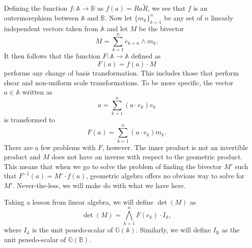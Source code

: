 \documentclass[12pt]{article}
\newcommand{\G}{\mathbb{G}}
\newcommand{\A}{\mathbb{A}}
\newcommand{\B}{\mathbb{B}}
\begin{document}
Defining the function $f:\A\to\B$ as $f(a)=Ra\tilde{R}$, we see that $f$ is an
outermorephism between $\A$ and $\B$.  Now let $\{m_k\}_{k=1}^n$ be any
set of $n$ linearly independent vectors taken from $\A$ and let $M$ be the
bivector
\begin{equation*}
M = \sum_{k=1}^n e_{k+n}\wedge m_k.
\end{equation*}
It then follows that the function $F:\A\to\A$ defined as
\begin{equation*}
F(a) = f(a)\cdot M
\end{equation*}
performs any change of basis transformation.  This includes those
that perform shear and non-uniform scale transformations.  To be more specific,
the vector $a\in\A$ written as
\begin{equation*}
a = \sum_{k=1}^n (a\cdot e_k)e_k
\end{equation*}
is transformed to
\begin{equation*}
F(a) = \sum_{k=1}^n (a\cdot e_k)m_k.
\end{equation*}
There are a few problems with $F$,
however.  The inner product is not an invertible product and $M$ does
not have an inverse with respect to the geometric product.  This means
that when we go to solve the problem of finding the bivector $M'$ such
that $F^{-1}(a) = M'\cdot f(a)$, geometric algebra offers no obvious
way to solve for $M'$.  Never-the-less, we will make do with what we have here.

Taking a lesson from linear algebra, we will define $\det(M)$ as
\begin{equation*}
\det(M) = \bigwedge_{k=1}^n F(e_k)\cdot I_{\A},
\end{equation*}
where $I_{\A}$ is the unit psuedo-scalar of $\G(\A)$.  Similarly, we will
define $I_{\B}$ as the unit psuedo-scalar of $\G(\B)$.
\end{document}
